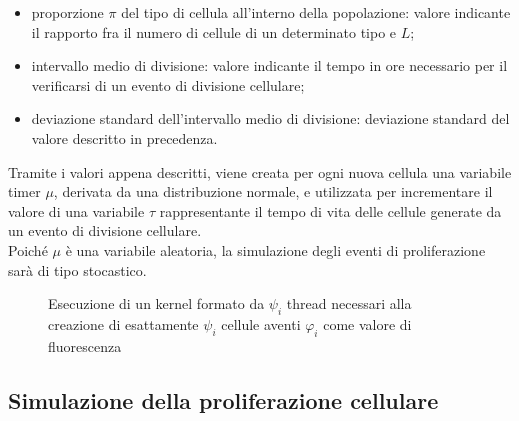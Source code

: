 \begin{itemize}
    \item proporzione $\pi$ del tipo di cellula all'interno della popolazione: 
        valore indicante il rapporto fra il numero di cellule
        di un determinato tipo e $L$;
    \item intervallo medio di divisione: valore indicante il tempo in ore
        necessario per il verificarsi di un evento di divisione cellulare;
    \item deviazione standard dell'intervallo medio di divisione: deviazione 
        standard del valore descritto in precedenza.
\end{itemize}
Tramite i valori appena descritti, viene creata per ogni nuova cellula 
una variabile timer $\mu$, derivata da una 
distribuzione normale, e utilizzata per incrementare il valore di una variabile 
$\tau$ rappresentante il tempo di vita delle cellule generate da un 
evento di divisione cellulare.
\\
Poiché $\mu$ è una variabile aleatoria, la simulazione degli eventi di 
proliferazione sarà di tipo stocastico.
\\
\begin{figure}[h]
    \centering
    \caption{Esecuzione di un kernel formato da $\psi_{i}$ thread necessari alla
        creazione di esattamente $\psi_{i}$ cellule aventi $\varphi_{i}$ come
        valore di fluorescenza}
    \label{fig:population-creation}
\end{figure}

\subsection{Simulazione della proliferazione cellulare}


